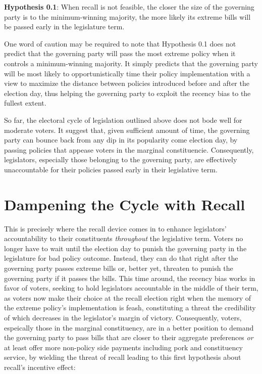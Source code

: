\documentclass{article}
\begin{document}
		\textbf{Hypothesis 0.1}: When recall is not feasible,
		the closer the size of the governing party is to the minimum-winning majority,
		the more likely its extreme bills will be passed early in the legislature term.
		
		One word of caution may be required
		to note that
		Hypothesis 0.1 does not predict that
		the governing party will pass the most extreme policy
		when it controls a minimum-winning majority.
		It simply predicts that
		the governing party will be most likely to opportunistically
		time their policy implementation
		with a view to maximize the distance between
		policies introduced before and after the election day,
		thus helping the governing party to exploit the recency bias
		to the fullest extent.
		
		So far, the electoral cycle of legislation outlined above
		does not bode well for moderate voters.
		It suggest that,
		given sufficient amount of time,
		the governing party can bounce back from
		any dip in its popularity come election day,
		by passing policies that appease voters in the marginal constituencie.
		Consequently,
		legislators, especially those belonging to the governing party,
		are effectively unaccountable for their policies
		passed early in their legislative term.
		
		
		
	
	
	\section*{Dampening the Cycle with Recall}
		
		This is precisely where the recall device comes in
		to enhance legislators' accountability to their constituents
		\textit{throughout} the legislative term.
		Voters no longer have to wait until the election day
		to punish the governing party in the legislature for bad policy outcome.
		Instead,
		they can do that right after the governing party passes extreme bills or,
		better yet,
		threaten to punish the governing party if it passes the bills.
		This time around,
		the recency bias works in favor of voters,
		seeking to hold legislators accountable in the middle of their term,
		as voters now make their choice at the recall election
		right when the memory of the extreme policy's implementation is feash,
		constituting a threat the credibility of which decreases in the
		legislator's margin of victory.
		Consequently,
		voters,
		espeically those in the marginal constituency,
		are in a better position to
		demand the governing party to pass bills that
		are closer to their aggregate preferences
		\textit{or} at least offer more non-policy side payments
		including pork and constituency service,
		by wielding the threat of recall leading to this first hypothesis
		about recall's incentive effect:
		
\end{document}
